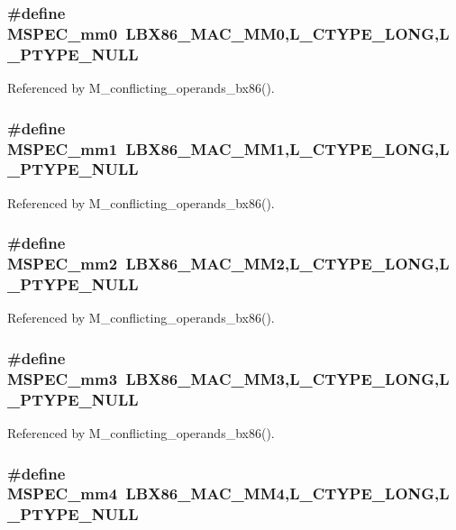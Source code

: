 \subsubsection{\setlength{\rightskip}{0pt plus 5cm}\#define MSPEC\_\-mm0~LBX86\_\-MAC\_\-MM0,L\_\-CTYPE\_\-LONG,L\_\-PTYPE\_\-NULL}\label{ml__bx86_8c_8e50436998145cb45543564944cff7f8}




Referenced by M\_\-conflicting\_\-operands\_\-bx86().
\subsubsection{\setlength{\rightskip}{0pt plus 5cm}\#define MSPEC\_\-mm1~LBX86\_\-MAC\_\-MM1,L\_\-CTYPE\_\-LONG,L\_\-PTYPE\_\-NULL}\label{ml__bx86_8c_63f15c951d292c6a4b359ca5ff5ced92}




Referenced by M\_\-conflicting\_\-operands\_\-bx86().
\subsubsection{\setlength{\rightskip}{0pt plus 5cm}\#define MSPEC\_\-mm2~LBX86\_\-MAC\_\-MM2,L\_\-CTYPE\_\-LONG,L\_\-PTYPE\_\-NULL}\label{ml__bx86_8c_dc5c54083caa2e1ee8e44395db7016ea}




Referenced by M\_\-conflicting\_\-operands\_\-bx86().
\subsubsection{\setlength{\rightskip}{0pt plus 5cm}\#define MSPEC\_\-mm3~LBX86\_\-MAC\_\-MM3,L\_\-CTYPE\_\-LONG,L\_\-PTYPE\_\-NULL}\label{ml__bx86_8c_65899c5258e4ca35eebe92c47d872866}




Referenced by M\_\-conflicting\_\-operands\_\-bx86().
\subsubsection{\setlength{\rightskip}{0pt plus 5cm}\#define MSPEC\_\-mm4~LBX86\_\-MAC\_\-MM4,L\_\-CTYPE\_\-LONG,L\_\-PTYPE\_\-NULL}\label{ml__bx86_8c_238a78ab071758997b12605977f74296}




